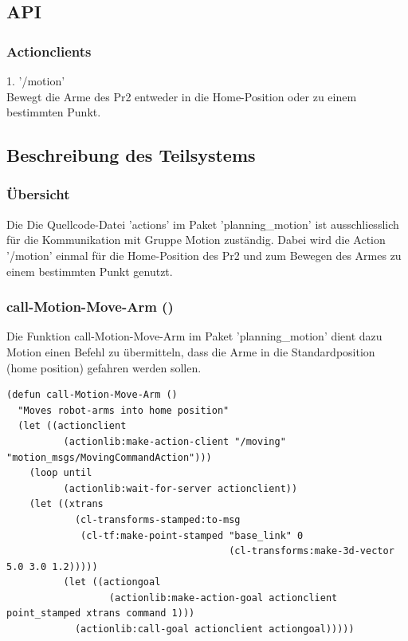 \documentclass{suturo}
\begin{document}
\subsection{API}
\subsubsection{Actionclients}
1. '/motion' \\
Bewegt die Arme des Pr2 entweder in die Home-Position oder zu einem bestimmten Punkt.
\subsection{Beschreibung des Teilsystems}
\subsubsection{\"Ubersicht}
Die Die Quellcode-Datei 'actions' im Paket 'planning\_motion'  ist ausschliesslich für die Kommunikation mit Gruppe Motion zuständig. Dabei wird die Action '/motion' einmal für die Home-Position des Pr2 und zum Bewegen des Armes zu einem bestimmten Punkt genutzt.


\subsubsection{call-Motion-Move-Arm ()}

Die Funktion call-Motion-Move-Arm im Paket 'planning\_motion' dient dazu Motion einen Befehl zu übermitteln, dass die Arme in die Standardposition (home position) gefahren werden sollen.


\noindent
\begin{minipage}{\linewidth}
\begin{lstlisting}
(defun call-Motion-Move-Arm ()
  "Moves robot-arms into home position"
  (let ((actionclient 
          (actionlib:make-action-client "/moving" "motion_msgs/MovingCommandAction")))
    (loop until
          (actionlib:wait-for-server actionclient))
    (let ((xtrans
            (cl-transforms-stamped:to-msg
             (cl-tf:make-point-stamped "base_link" 0 
                                       (cl-transforms:make-3d-vector 5.0 3.0 1.2)))))
          (let ((actiongoal 
                  (actionlib:make-action-goal actionclient point_stamped xtrans command 1)))
            (actionlib:call-goal actionclient actiongoal)))))
\end{lstlisting}
\end{minipage}
\end{document}
